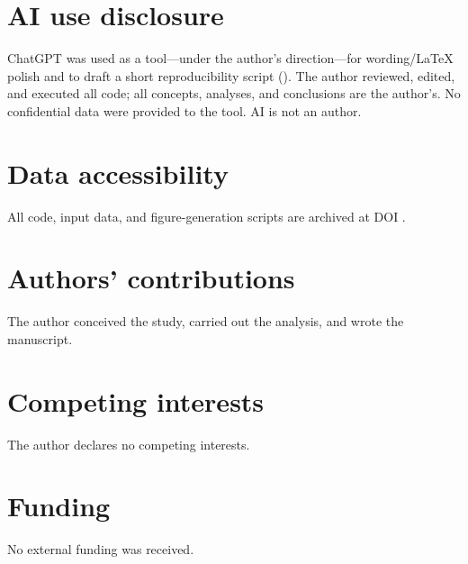 \documentclass[11pt,a4paper]{article}
\begin{document}
\section*{AI use disclosure}
ChatGPT was used as a tool—under the author's direction—for wording/\LaTeX{}
polish and to draft a short reproducibility script
(). The author reviewed, edited, and executed all
code; all concepts, analyses, and conclusions are the author's. No confidential
data were provided to the tool. AI is not an author.

\ifwithglossary
  \printglossary[type=\acronymtype,title={Acronyms}]
  \printglossary[title={Glossary}]
\fi

\section*{Data accessibility}
All code, input data, and figure-generation scripts are archived at DOI \RepoDOIlink.

\section*{Authors’ contributions}
The author conceived the study, carried out the analysis, and wrote the manuscript.

\section*{Competing interests}
The author declares no competing interests.

\section*{Funding}
No external funding was received.

\ifshowbib
  \nocite{*} %
  \printbibliography
\fi
\end{document}
